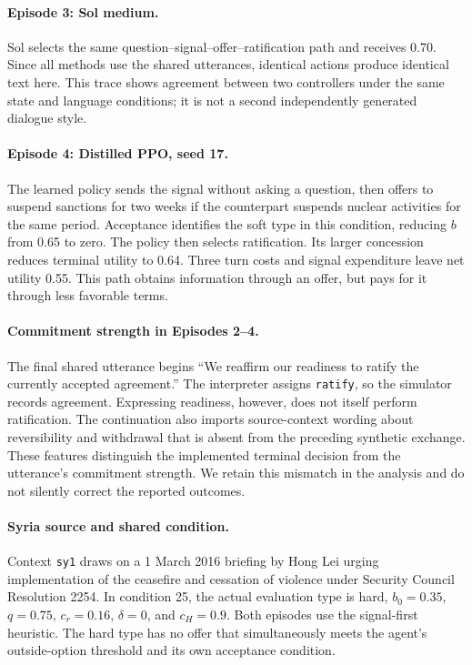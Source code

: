 \paragraph{Episode 3: Sol medium.}
Sol selects the same question--signal--offer--ratification path and receives 0.70. Since all methods use the shared utterances, identical actions produce identical text here. This trace shows agreement between two controllers under the same state and language conditions; it is not a second independently generated dialogue style.

\paragraph{Episode 4: Distilled PPO, seed 17.}
The learned policy sends the signal without asking a question, then offers to suspend sanctions for two weeks if the counterpart suspends nuclear activities for the same period. Acceptance identifies the soft type in this condition, reducing $b$ from 0.65 to zero. The policy then selects ratification. Its larger concession reduces terminal utility to 0.64. Three turn costs and signal expenditure leave net utility 0.55. This path obtains information through an offer, but pays for it through less favorable terms.

\paragraph{Commitment strength in Episodes 2--4.}
The final shared utterance begins ``We reaffirm our readiness to ratify the currently accepted agreement.'' The interpreter assigns \texttt{ratify}, so the simulator records agreement. Expressing readiness, however, does not itself perform ratification. The continuation also imports source-context wording about reversibility and withdrawal that is absent from the preceding synthetic exchange. These features distinguish the implemented terminal decision from the utterance's commitment strength. We retain this mismatch in the analysis and do not silently correct the reported outcomes.

\paragraph{Syria source and shared condition.}
Context \texttt{sy1} draws on a 1 March 2016 briefing by Hong Lei urging implementation of the ceasefire and cessation of violence under Security Council Resolution 2254. In condition 25, the actual evaluation type is hard, $b_0=0.35$, $q=0.75$, $c_r=0.16$, $\delta=0$, and $c_H=0.9$. Both episodes use the signal-first heuristic. The hard type has no offer that simultaneously meets the agent's outside-option threshold and its own acceptance condition.


